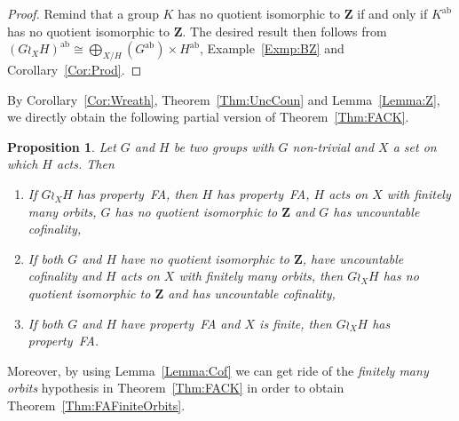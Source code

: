 \documentclass[a4paper]{article}
\newtheorem{prop}[lem]{Proposition}
\theoremstyle{definition}
\DeclareMathOperator\ab{ab}
\newcommand*{\field}[1]{\mathbf{#1}}
\newcommand*{\Z}{\field{Z}}
\newcommand*{\FA}{FA}
\begin{document}
\begin{proof}
Remind that a group $K$ has no quotient isomorphic to $\Z$ if and only if $K^{\ab}$ has no quotient isomorphic to $\Z$.
The desired result then follows from $(G\wr_XH)^{\ab}\cong \bigoplus_{X/H}(G^{\ab})\times H^{\ab}$, Example~\ref{Exmp:BZ} and Corollary~\ref{Cor:Prod}.
\end{proof}
%
%
By Corollary~\ref{Cor:Wreath}, Theorem~\ref{Thm:UncCoun} and Lemma~\ref{Lemma:Z}, we directly obtain the following partial version of Theorem~\ref{Thm:FACK}.
%
%
\begin{prop}\label{Prop:WRFA}
Let $G$ and $H$ be two groups with $G$ non-trivial and $X$ a set on which $H$ acts.
Then
\begin{enumerate}
\item If $G\wr_XH$ has property~\FA, then $H$ has property~\FA, $H$ acts on $X$ with finitely many orbits, $G$ has no quotient isomorphic to $\Z$ and $G$ has uncountable cofinality,
\item If both $G$ and $H$ have no quotient isomorphic to $\Z$, have uncountable cofinality and $H$ acts on $X$ with finitely many orbits, then $G\wr_XH$ has no quotient isomorphic to $\Z$ and has uncountable cofinality,
\item If both $G$ and $H$ have property~\FA{} and $X$ is finite, then $G\wr_XH$ has property~FA.
\end{enumerate}
\end{prop}
%
%
Moreover, by using Lemma~\ref{Lemma:Cof} we can get ride of the \emph{finitely many orbits} hypothesis in Theorem~\ref{Thm:FACK} in order to obtain Theorem~\ref{Thm:FAFiniteOrbits}.

%
%
%
%
%
%
%
%
%
%


%
%
%
%
%
%
%
%
%
%
\end{document}
